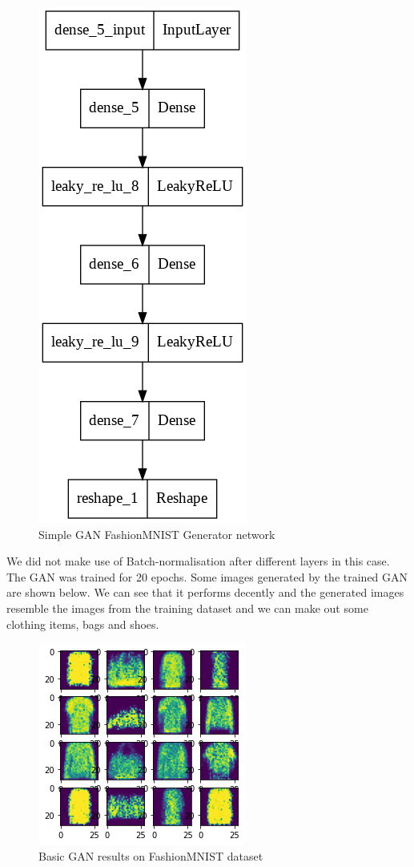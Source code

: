 \documentclass[conference]{IEEEtran}
\begin{document}
\begin{figure}[h]
\centering
\includegraphics[scale = 0.25]{dGAN_FMNIST_gen_model.png}
  \caption{Simple GAN FashionMNIST Generator network}
\end{figure}

We did not make use of Batch-normalisation after different layers in this case. The GAN was trained for 20 epochs. Some images generated by the trained GAN are shown below. We can see that it performs decently and the generated images resemble the images from the training dataset and we can make out some clothing items, bags and shoes.

\begin{figure}[h]
\centering
\includegraphics[scale = 0.7]{on_f_mnist.png}
  \caption{Basic GAN results on FashionMNIST dataset}
\end{figure}
\end{document}

